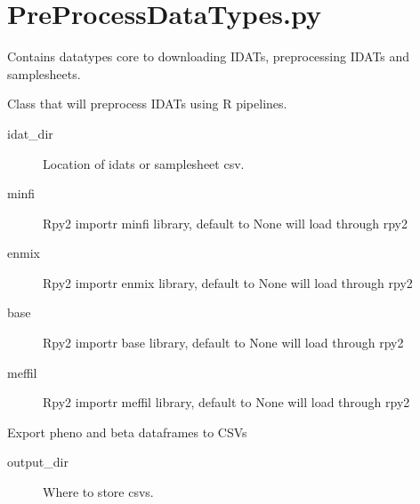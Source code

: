 \documentclass[letterpaper,10pt,english]{sphinxmanual}
\begin{document}
\chapter{PreProcessDataTypes.py}
\label{\detokenize{index:preprocessdatatypes-py}}
Contains datatypes core to downloading IDATs, preprocessing IDATs and samplesheets.

\begin{fulllineitems}
\label{\detokenize{index:pymethylprocess.PreProcessDataTypes.PreProcessIDAT}}
Class that will preprocess IDATs using R pipelines.
\begin{description}
\item[{idat\_dir}] \leavevmode
Location of idats or samplesheet csv.

\item[{minfi}] \leavevmode
Rpy2 importr minfi library, default to None will load through rpy2

\item[{enmix}] \leavevmode
Rpy2 importr enmix library, default to None will load through rpy2

\item[{base}] \leavevmode
Rpy2 importr base library, default to None will load through rpy2

\item[{meffil}] \leavevmode
Rpy2 importr meffil library, default to None will load through rpy2

\end{description}

\begin{fulllineitems}
\label{\detokenize{index:pymethylprocess.PreProcessDataTypes.PreProcessIDAT.export_csv}}
Export pheno and beta dataframes to CSVs
\begin{description}
\item[{output\_dir}] \leavevmode
Where to store csvs.


\end{description}
\end{fulllineitems}
\end{fulllineitems}
\end{document}

